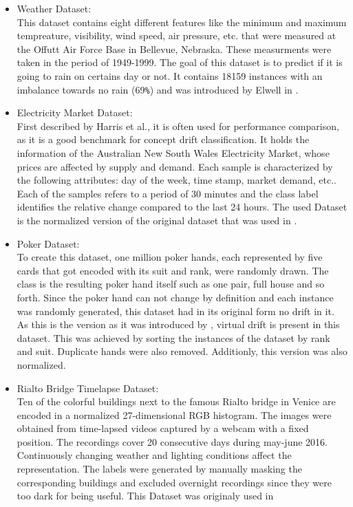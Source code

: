 \documentclass[12pt,oneside,a4paper,parskip]{scrbook}
\begin{document}
\begin{itemize}
  \item Weather Dataset: \\
        This dataset contains eight different features like the minimum and maximum tempreature, visibility, wind speed, 
        air pressure, etc. that were measured at the Offutt Air Force Base in Bellevue, Nebraska. These measurments were
        taken in the period of 1949-1999. The goal of this dataset is to predict if it is going to rain on certains day or not.
        It contains 18159 instances with an imbalance towards no rain (69\verb|%|) and was introduced by Elwell in \cite{weather}.

  \item Electricity Market Dataset:\\
        First described by Harris et al., it is often used for performance comparison, as it is a good benchmark for concept drift 
        classification. It holds the information of the Australian New South Wales Electricity Market, whose prices are affected 
        by supply and demand. Each sample is characterized by the following attributes: day of the week, time stamp, market demand,
        etc.. Each of the samples refers to a period of 30 minutes and the class label identiﬁes the relative change compared to the
        last 24 hours. The used Dataset is the normalized version of the original dataset that was used in \cite{MLonDataStreams}.

  \item Poker Dataset: \\
        To create this dataset, one million poker hands, each represented by five cards that got encoded with its suit and rank, 
        were randomly drawn. The class is the resulting poker hand itself such as one pair, full house and so forth.
        Since the poker hand can not change by definition and each instance was randomly generated, this dataset had 
        in its original form no drift in it.
        As this is the version as it was introduced by \cite{bifet2013efficient}, virtual drift is present in this dataset. 
        This was achieved by sorting the instances of the dataset by rank and suit. Duplicate hands were also removed.
        Additionly, this version was also normalized.

  \item Rialto Bridge Timelapse Dataset: \\
        Ten of the colorful buildings next to the famous Rialto bridge in Venice are encoded in a normalized 
        27-dimensional RGB histogram. The images were obtained from time-lapsed videos captured by a webcam with a fixed
        position. The recordings cover 20 consecutive days during may-june 2016. Continuously changing weather and 
        lighting conditions affect the representation. The labels were generated by manually masking the corresponding 
        buildings and excluded overnight recordings since they were too dark for being useful. 
        This Dataset was originaly used in \cite{movingsquaresChessboardRialtobridge}
\end{itemize}
\end{document}
